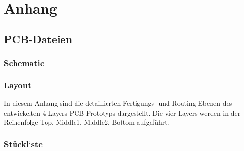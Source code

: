 
\chapter{Anhang}

\section{PCB-Dateien}

\subsection{Schematic}
\label{anhang:schematic}


\subsection{Layout}

In diesem Anhang sind die detaillierten Fertigungs- und Routing-Ebenen des entwickelten 
4-Layers PCB-Prototyps dargestellt. Die vier Layers werden in der Reihenfolge Top, Middle1, Middle2, Bottom aufgeführt. 






\subsection{Stückliste}

\begin{center}
\end{center}

